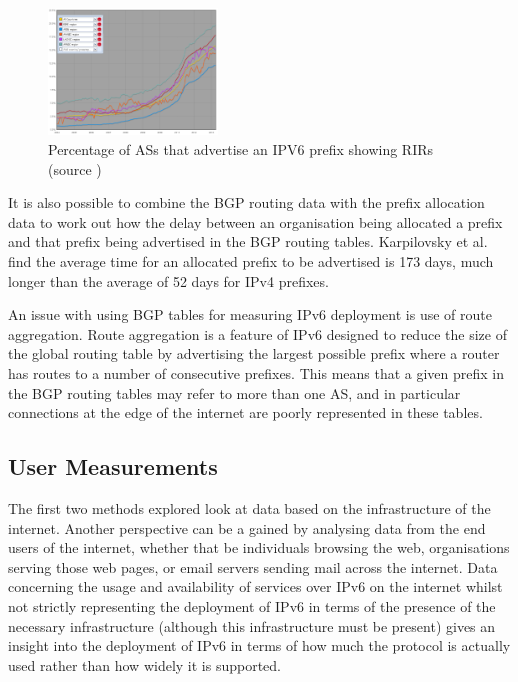 \begin{figure}[htb]
\centering
\includegraphics[width=0.4\textwidth]{img/v6-bgp-rirs.png}
\caption{Percentage of ASs that advertise an IPV6 prefix showing RIRs (source
\protect\cite{ripe_ncc_ipv6_2013})}
\label{fig:bgp-rirs}
\end{figure}

It is also possible to combine the BGP routing data with the prefix allocation
data to work out how the delay between an organisation being allocated a prefix
and that prefix being advertised in the BGP routing tables. Karpilovsky et al.
find the average time for an allocated prefix to be advertised is 173 days, much
longer than the average of 52 days for IPv4 prefixes\cite{karpilovsky_quantifying_2009}.

An issue with using BGP tables for measuring IPv6 deployment is use of route
aggregation. Route aggregation is a feature of IPv6 designed to reduce the size of the
global routing table by advertising the largest possible prefix where a router
has routes to a number of consecutive prefixes. This means that a given prefix in
the BGP routing tables may refer to more than one AS, and in particular
connections at the edge of the internet are poorly represented in these
tables\cite{dhamdhere_measuring_2012}.


\subsection{User Measurements}

The first two methods explored look at data based on the
infrastructure of the internet. Another perspective can be a gained by analysing
data from the end users of the internet, whether that be individuals browsing
the web, organisations serving those web pages, or email servers sending mail
across the internet. Data concerning the usage and availability of services over
IPv6 on the internet whilst not strictly representing the deployment of IPv6 in
terms of the presence of the necessary infrastructure (although this
infrastructure must be
present) gives an insight into the deployment of IPv6 in terms of
how much the protocol is actually used rather than how widely it is supported.

